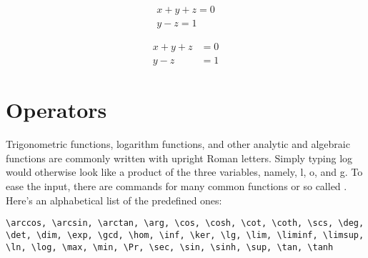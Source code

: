 \begin{gather}
x + y + z = 0 \\ 
y-z= 1
\end{gather}


\begin{align}
  x + y + z &= 0 \\
  y - z &= 1
\end{align}

\section{Operators}
\label{sec:operators}

Trigonometric functions, logarithm functions, and other analytic and algebraic functions are commonly written with upright Roman letters.
Simply typing log would otherwise look like a product of the three variables, namely, l, o, and g.
To ease the input, there are commands for many common functions or so called .
Here's an alphabetical list of the predefined ones:
\begin{lstlisting}
\arccos, \arcsin, \arctan, \arg, \cos, \cosh, \cot, \coth, \scs, \deg, \det, \dim, \exp, \gcd, \hom, \inf, \ker, \lg, \lim, \liminf, \limsup, \ln, \log, \max, \min, \Pr, \sec, \sin, \sinh, \sup, \tan, \tanh
\end{lstlisting}

\newpage{}
